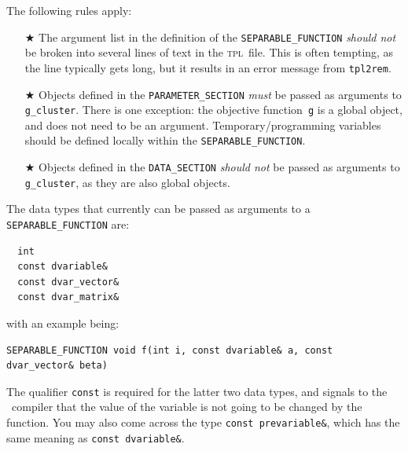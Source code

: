 \documentclass{admbmanual}
\begin{document}
The following rules apply:
\begin{itemize}
  \item[$\bigstar$] The argument list in the definition of the
  \texttt{SEPARABLE\_FUNCTION} \textit{should not} be broken into several lines
  of text in the \textsc{tpl}~file. This is often tempting, as the line
  typically gets long, but it results in an error message from \texttt{tpl2rem}.

  \item[$\bigstar$] Objects defined in the \texttt{PARAMETER\_SECTION}
  \textit{must} be passed as arguments to \texttt{g\_cluster}. There is one
  exception: the objective function~\texttt{g} is a global object, and does not
  need to be an argument. Temporary/programming variables should be defined
  locally within the \texttt{SEPARABLE\_FUNCTION}.

  \item[$\bigstar$] Objects defined in the \texttt{DATA\_SECTION} \textit{should
    not} be passed as arguments to \texttt{g\_cluster}, as they are also global
  objects.
\end{itemize}
The data types that currently can be passed as arguments to a
\texttt{SEPARABLE\_FUNCTION} are:
\begin{lstlisting}
  int
  const dvariable&
  const dvar_vector&
  const dvar_matrix&
\end{lstlisting}
with an example being:
\begin{lstlisting}
SEPARABLE_FUNCTION void f(int i, const dvariable& a, const dvar_vector& beta)
\end{lstlisting}
The qualifier \texttt{const} is required for the latter two data types, and
signals to the \cplus~compiler that the value of the variable is not going to be
changed by the function. You may also come across the type \texttt{const
  prevariable\&}, which has the same meaning as \texttt{const dvariable\&}.
\end{document}
